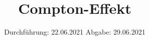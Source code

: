 

\subject{V603}
\title{Compton-Effekt}
\date{%
  Durchführung: 22.06.2021
  \hspace{3em}
  Abgabe: 29.06.2021
}



\maketitle
\thispagestyle{empty}
\tableofcontents
\newpage






\printbibliography{}


